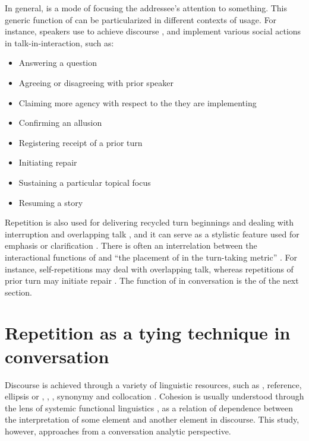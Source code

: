 \documentclass[output=paper]{LSP/langsci}
\begin{document}
In general,  is a mode of focusing the addressee’s attention to something. This generic function of  can be particularized in different contexts of usage. For instance, speakers use  to achieve discourse  \citep{goodwin87,norrick87,tannen87,tannen89,johnstone94,tyler94,sacks95,brown.2000}, and implement various social actions in talk-in-interaction, such as:

\begin{itemize}
\item Answering a question \citep{norrick87,raymond03,stiversHayashi10,stivers11}
\item Agreeing or disagreeing with prior speaker \citep{pomeratz84,goodwin87,norrick87,tannen87}
\item Claiming more agency with respect to the  they are implementing \citep{stivers10,heritage2012,lee12}
\item Confirming an allusion \citep{schegloff96a}
\item Registering receipt of a prior turn \citep{tannen89,schegloff97,kim02}
\item Initiating repair \citep{schegloff77,sorjonen96,kim02}
\item Sustaining a particular topical focus \citep{tannen89,kim02}
\item Resuming a story \citep{wong10}
\end{itemize}

Repetition is also used for delivering recycled turn beginnings \citep{schegloff87} and dealing with interruption and overlapping talk \citep{norrick87,johnstone94}, and it can serve as a stylistic feature used for emphasis or clarification \citep{norrick87,johnstone94}. There is often an interrelation between the interactional functions of  and ``the placement of  in the turn-taking metric'' \citep[][411]{wong10}. For instance, self-repetitions may deal with overlapping talk, whereas repetitions of prior turn may initiate repair \citep{wong10}. 
The  function of  in conversation is the  of the next section. 

\section{Repetition as a tying technique in conversation}
\label{Alrepetition.tying}
Discourse  is achieved through a variety of linguistic resources, such as , reference, ellipsis or , , , synonymy and collocation \citep{martin01}. Cohesion is usually understood through the lens of systemic functional linguistics \citep{halliday73,hasan76}, as a relation of dependence between the interpretation of some element and another element in discourse. This study, however, approaches  from a conversation analytic perspective. 
\end{document}

